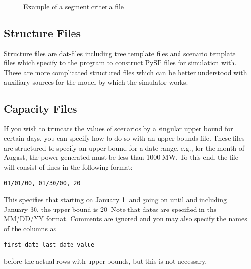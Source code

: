 \documentclass[11pt]{article}
\begin{document}
\begin{figure}[H]
	\begin{framed}
		
	\end{framed}
	\caption{Example of a segment criteria file}
	\label{fig:segment}
\end{figure}


\subsection{Structure Files}

Structure files are dat-files including tree template files and scenario template files which specify to the program to construct PySP files for simulation with. These are more complicated structured files which can be better understood with auxiliary sources for the model by which the simulator works.


\subsection{Capacity Files}
If you wish to truncate the values of scenarios by a singular upper bound for certain days, you can specify how to do so with an upper bounds file.
These files are structured to specify an upper bound for a date range, e.g., for the month of August, the power generated must be less than 1000 MW.
To this end, the file will consist of lines in the following format:

\begin{verbatim}
01/01/00, 01/30/00, 20
\end{verbatim}	
This specifies that starting on January 1, and going on until and including January 30, the upper bound is 20. Note that dates are specified in the MM/DD/YY format. Comments are ignored and you may also specify the names of the columns as

\begin{verbatim}
first_date last_date value
\end{verbatim}
before the actual rows with upper bounds, but this is not necessary.
\end{document}
